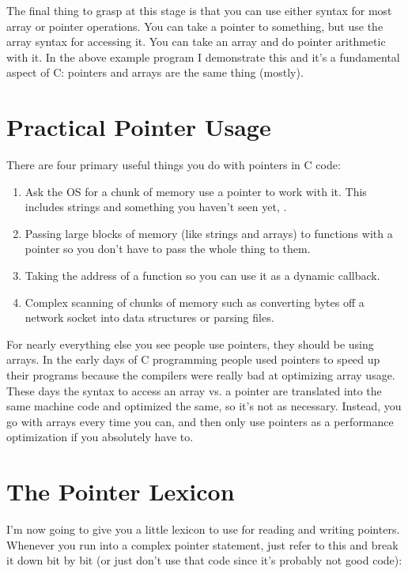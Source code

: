 The final thing to grasp at this stage is that you can use either syntax
for most array or pointer operations.  You can take a pointer to something,
but use the array syntax for accessing it.  You can take an array and do
pointer arithmetic with it.  In the above example program I demonstrate this
and it's a fundamental aspect of C: pointers and arrays are the same thing (mostly).

\section{Practical Pointer Usage}

There are four primary useful things you do with pointers in C code:

\begin{enumerate}
\item Ask the OS for a chunk of memory use a pointer
    to work with it.  This includes strings and something you haven't seen
    yet, .
\item Passing large blocks of memory (like strings and arrays) to functions
    with a pointer so you don't have to pass the whole thing to them.
\item Taking the address of a function so you can use it as a dynamic callback.
\item Complex scanning of chunks of memory such as converting bytes off a network
    socket into data structures or parsing files.
\end{enumerate}

For nearly everything else you see people use pointers, they should be using
arrays.  In the early days of C programming people used pointers to speed
up their programs because the compilers were really bad at optimizing array 
usage.  These days the syntax to access an array vs. a pointer are translated
into the same machine code and optimized the same, so it's not as necessary.
Instead, you go with arrays every time you can, and then only use pointers
as a performance optimization if you absolutely have to.


\section{The Pointer Lexicon}

I'm now going to give you a little lexicon to use for reading and writing
pointers.  Whenever you run into a complex pointer statement, just refer
to this and break it down bit by bit (or just don't use that code since it's
probably not good code):

